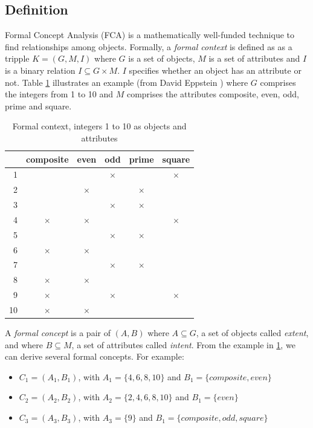 \documentclass[11pt]{report}
\begin{document}
\subsection{Definition}

Formal Concept Analysis (FCA) \cite{Ganter2012} is a mathematically well-funded technique to find relationships among objects. Formally, a \textit{formal context} is defined as as a tripple $K = (G, M, I)$ where $G$ is a set of objects, $M$ is a set of attributes and $I$ is a binary relation $I \subseteq G \times M$. $I$ specifies whether an object has an attribute or not. Table \ref{table:example} illustrates an example (from David Eppstein \cite{fcaexample}) where $G$ comprises the integers from 1 to 10 and $M$ comprises the attributes composite, even, odd, prime and square.


\begin{table}[h]
\caption{Formal context, integers 1 to 10 as objects and attributes}
\label{table:example}
\centering

\def\arraystretch{1.2}%
\begin{tabular}{ r c c c c c}
\hline
  & composite & even & odd & prime & square\\
\hline

1 & & & $\times$ & &$\times$\\ 
2 & & $\times$ & & $\times$ &\\
3 & & & $\times$ & $\times$ &\\ 
4 & $\times$ & $\times$ & & & $\times$\\
5 & & & $\times$ & $\times$ &\\
6 & $\times$ & $\times$ & & &\\
7 & & & $\times$ & $\times$ &\\ 
8 & $\times$ & $\times$ & & &\\
9 & $\times$ & & $\times$ & & $\times$\\
10 & $\times$ & $\times$ & & &\\ \hline


\end{tabular}
\end{table}

A \textit{formal concept} is a pair of $(A, B)$ where $A \subseteq G$, a set of objects called \textit{extent}, and where $B \subseteq M$, a set of attributes called \textit{intent}. From the example in \ref{table:example}, we can derive several formal concepts. For example:
	\begin{itemize}
		\item $C_1 = (A_1, B_1)$,  with $A_1 = \{4,6,8,10\}$ and $B_1 = \{composite, even\}$
		\item $C_2 = (A_2, B_2)$,  with $A_2 = \{2,4,6,8,10\}$ and $B_1 = \{even\}$
		\item $C_3 = (A_3, B_3)$,  with $A_3 = \{9\}$ and $B_1 = \{composite, odd, square\}$
	\end{itemize}
\end{document}
